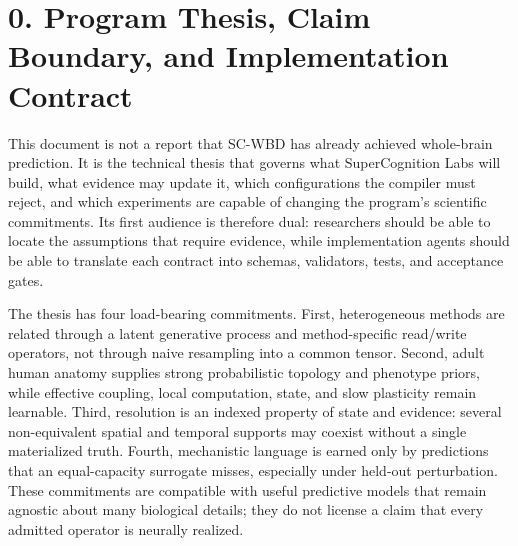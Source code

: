 \section{0. Program Thesis, Claim Boundary, and Implementation Contract}

This document is not a report that SC-WBD has already achieved whole-brain
prediction. It is the technical thesis that governs what SuperCognition Labs
will build, what evidence may update it, which configurations the compiler
must reject, and which experiments are capable of changing the program's
scientific commitments. Its first audience is therefore dual: researchers
should be able to locate the assumptions that require evidence, while
implementation agents should be able to translate each contract into schemas,
validators, tests, and acceptance gates.

The thesis has four load-bearing commitments. First, heterogeneous methods are
related through a latent generative process and method-specific read/write
operators, not through naive resampling into a common tensor. Second, adult
human anatomy supplies strong probabilistic topology and phenotype priors,
while effective coupling, local computation, state, and slow plasticity remain
learnable. Third, resolution is an indexed property of state and evidence:
several non-equivalent spatial and temporal supports may coexist without a
single materialized truth. Fourth, mechanistic language is earned only by
predictions that an equal-capacity surrogate misses, especially under held-out
perturbation. These commitments are compatible with useful predictive models
that remain agnostic about many biological details; they do not license a
claim that every admitted operator is neurally realized.

